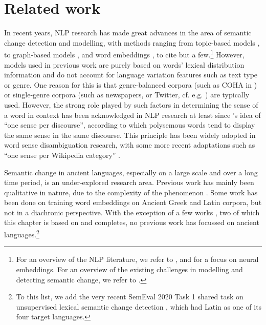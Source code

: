 \documentclass[output=paper%
]{langscibook}
\begin{document}
\section{Related work}
\label{sec:related}

In recent years, NLP research has made great advances in the area of semantic change detection and modelling, with methods ranging from topic-based models \citep{topicmodelswsd, cook-etal-2014-novel,lau2014learning,wijaya2011understanding, frermann-lapata-2016-bayesian}, to graph-based models \citep{mitra-etal-2014-thats,mitra2015automatic,tahmasebi-ranlp17}, and word embeddings \citep{kim-etal-2014-temporal,basile2018,kulkarni2015statistically,hamilton-etal-2016-diachronic,dubossarsky-etal-2017-outta,tahmasebi2018study,rudolphb18-dynamicembforlangevo,jatowt2018every,dubossarsky-etal-2019-time}, to cite but a few.\footnote{For an overview of the NLP literature, we refer to
\citet{tahmasebi2018survey}, and \citet{kutuzov-etal-2018-diachronic} for a focus on neural embeddings. For an overview of the existing challenges in modelling and detecting semantic change, we refer to .}
However, models used in previous work are purely based on words' lexical distribution information and do not account for language variation features such as text type or genre. One reason for this is that genre-balanced corpora (such as COHA in \citealp{davies2012expanding}) or single-genre corpora (such as newspapers, or Twitter, cf. e.g. \citealp{shoemark-etal-2019-room}) are typically used. 
However, the strong role played by such factors in determining the sense of a word in context has been acknowledged in NLP research at least since \citet{gale-etal-1992-one}'s idea of ``one sense per discourse'', according to which polysemous words tend to display the same sense in the same discourse. This principle has been widely adopted in word sense disambiguation research, with some more recent adaptations such as ``one sense per Wikipedia category'' \citep{scarlini-etal-2020-sense}.



Semantic change in ancient languages, especially on a large scale and over a long time period, is an under-explored research area. Previous work has mainly been  qualitative in nature, due to the complexity of the phenomenon \citep[cf. e.g.][]{leiwoetal2012, clackson}. 
Some work has been done on training word embeddings on Ancient Greek \citep{rodda2019} and Latin \citep{sprugnoli} corpora, but not in a diachronic perspective.
With the exception of a few works \citep{bamman2011,eger-mehler-2016-linearity,rodda2016,perrone-etal-2019-gasc,mcgillivray2019computational}, two of which this chapter is based on and completes, no previous work has focussed on ancient languages.\footnote{To this list, we add the very recent SemEval 2020 Task 1 shared task on unsupervised lexical semantic change detection \citep{schlechtweg-etal-2020-semeval}, which had Latin as one of its four target languages.}
\end{document}

